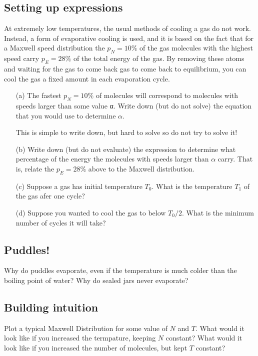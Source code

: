 \documentclass{article}
\begin{document}
\subsection{Setting up expressions}

At extremely low temperatures, the usual methods of cooling a gas
do not work. Instead, a form of evaporative cooling is used, and it is
based on the fact that for a Maxwell speed distribution the $p_N = 10\%$
of the gas molecules with the highest speed carry $p_E = 28\%$ of the total
energy of the gas. By removing these atoms and waiting for the gas
to come back gas to come back to equilibrium, you can cool the gas a
fixed amount in each evaporation cycle.
\begin{itemize}
	\item[(a)] The fastest $p_N = 10\%$ of molecules will correspond to molecules
with speeds larger than some value α. Write down (but do not
solve) the equation that you would use to determine $\alpha$.

This is simple to write down, but hard to solve so do not try to
solve it!
	\item[(b)] Write down (but do not evaluate) the expression to determine
what percentage of the energy the molecules with speeds larger
than $\alpha$ carry. That is, relate the $p_E = 28\%$ above to the Maxwell
distribution.
	\item[(c)] Suppose a gas has initial temperature $T_0$. What is the temperature $T_1$ of the gas afer one cycle?
	\item[(d)] Suppose you wanted to cool the gas to below $T_0/2$. What is the minimum number of cycles it will take?
\end{itemize}

\subsection{Puddles!}

Why do puddles evaporate, even if the temperature is much colder than the boiling point of water? Why do sealed jars never evaporate?

\subsection{Building intuition}

Plot a typical Maxwell Distribution for some value of $N$ and $T$. What would it look like if you increased the termpature, keeping $N$ constant? What would it look like if you increased the number of molecules, but kept $T$ constant?
\end{document}

